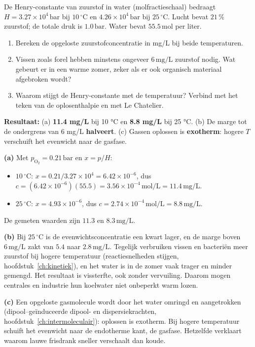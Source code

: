 \begin{oefening}\label{oef:h5-10}
De Henry-constante van zuurstof in water (molfractieschaal) bedraagt \(H = 3.27\times10^{4}\,\mathrm{bar}\) bij \(10\,^\circ\mathrm{C}\) en \(4.26\times10^{4}\,\mathrm{bar}\) bij \(25\,^\circ\mathrm{C}\). Lucht bevat \(21\,\%\) zuurstof; de totale druk is \(1.0\,\mathrm{bar}\). Water bevat \(55.5\,\mathrm{mol}\) per liter.

\begin{enumerate}
\item[(a)]
  Bereken de opgeloste zuurstofconcentratie in mg/L bij beide temperaturen.
\item[(b)]
  Vissen zoals forel hebben minstens ongeveer \(6\,\mathrm{mg/L}\) zuurstof nodig. Wat gebeurt er in een warme zomer, zeker als er ook organisch materiaal afgebroken wordt?
\item[(c)]
  Waarom stijgt de Henry-constante met de temperatuur? Verbind met het teken van de oplosenthalpie en met Le Chatelier.
\end{enumerate}
\end{oefening}
\begin{oplossing}
\textbf{Resultaat:} (a) \textbf{11.4 mg/L} bij 10 °C en \textbf{8.8 mg/L} bij 25 °C. (b) De marge tot de ondergrens van 6 mg/L \textbf{halveert}. (c) Gassen oplossen is \textbf{exotherm}: hogere \(T\) verschuift het evenwicht naar de gasfase.

\textbf{(a)} Met \(p_{\mathrm{O_2}} = 0.21\,\mathrm{bar}\) en \(x = p/H\):

\begin{itemize}
\item
  \(10\,^\circ\mathrm{C}\): \(x = 0.21/3.27\times10^{4} = 6.42\times10^{-6}\), dus \(c = (6.42\times10^{-6})(55.5) = 3.56\times10^{-4}\,\mathrm{mol/L} = 11.4\,\mathrm{mg/L}\).
\item
  \(25\,^\circ\mathrm{C}\): \(x = 4.93\times10^{-6}\), dus \(c = 2.74\times10^{-4}\,\mathrm{mol/L} = 8.8\,\mathrm{mg/L}\).
\end{itemize}

De gemeten waarden zijn \(11.3\) en \(8.3\,\mathrm{mg/L}\).

\textbf{(b)} Bij \(25\,^\circ\mathrm{C}\) is de evenwichtsconcentratie een kwart lager, en de marge boven \(6\,\mathrm{mg/L}\) zakt van \(5.4\) naar \(2.8\,\mathrm{mg/L}\). Tegelijk verbruiken vissen en bacteriën meer zuurstof bij hogere temperatuur (reactiesnelheden stijgen, hoofdstuk~\ref{ch:kinetiek}), en het water is in de zomer vaak trager en minder gemengd. Het resultaat is vissterfte, ook zonder vervuiling. Daarom mogen centrales en industrie hun koelwater niet onbeperkt warm lozen.

\textbf{(c)} Een opgeloste gasmolecule wordt door het water omringd en aangetrokken (dipool--geïnduceerde dipool- en dispersiekrachten, hoofdstuk~\ref{ch:intermoleculair}): oplossen is exotherm. Bij hogere temperatuur schuift het evenwicht naar de endotherme kant, de gasfase. Hetzelfde verklaart waarom lauwe frisdrank sneller verschaalt dan koude.
\end{oplossing}

